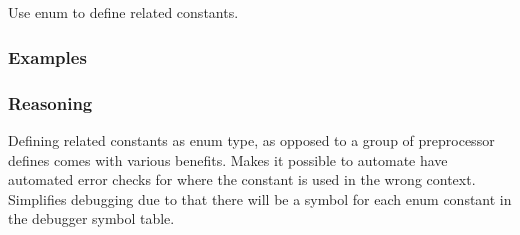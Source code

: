 \subsection*{\myRule{}}

Use enum to define related constants.

\subsubsection*{Examples}

\begin{minipage}[t]{0.47\linewidth}
    
\end{minipage}
\hfill
\begin{minipage}[t]{0.47\linewidth}
    
\end{minipage}

\subsubsection*{Reasoning}

Defining related constants as enum type, as opposed to a group of preprocessor defines comes with various benefits. Makes it possible to automate have automated error checks for where the constant is used in the wrong context. Simplifies debugging due to that there will be a symbol for each enum constant in the debugger symbol table.
